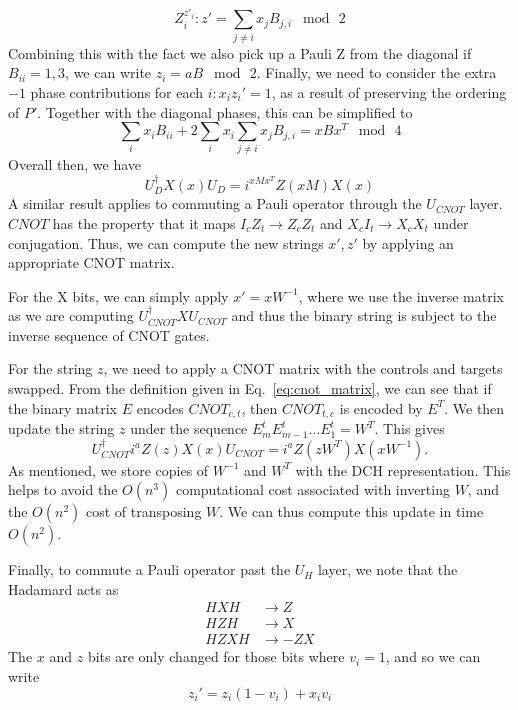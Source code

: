 \[Z_{i}^{z'_{i}}:z' = \sum_{j\neq i}x_{j}B_{j,i}\;\bmod\,2\]
Combining this with the fact we also pick up a Pauli Z from the diagonal if $B_{ii}=1,3$, we can write $z_{i}=aB\;\bmod\,2$. Finally, we need to consider the extra $-1$ phase  contributions for each $i:x_{i}z_{i}'=1$, as a result of preserving the ordering of $P'$. Together with the diagonal phases, this can be simplified to
\[
\sum_{i}x_{i}B_{ii} + 2\sum_{i}x_{i}\sum_{j\neq i}x_{j}B_{j,i} = xBx^{T}\;\bmod\, 4
\]
Overall then, we have
\begin{equation}
U_{D}^{\dagger}X(x)U_{D} = i^{xMx^{T}}Z(xM)X(x)
\label{eq:dch_dupdate}
\end{equation}
A similar result applies to commuting a Pauli operator through the $U_{CNOT}$ layer. $CNOT$ has the property that it maps $I_{c}Z_{t}\rightarrow Z_{c}Z_{t}$ and $X_{c}I_{t}\rightarrow X_{c}X_{t}$ under conjugation. Thus, we can compute the new strings $x',z'$ by applying an appropriate CNOT matrix.\par
For the X bits, we can simply apply $x'=xW^{-1}$, where we use the inverse matrix as we are computing $U_{CNOT}^{\dagger} X U_{CNOT}$ and thus the binary string is subject to the inverse sequence of CNOT gates. \par
For the string $z$, we need to apply a CNOT matrix with the controls and targets swapped. From the definition given in Eq.~\ref{eq:cnot_matrix}, we can see that if the binary matrix $E$ encodes $CNOT_{c,t}$, then $CNOT_{t,c}$ is encoded by $E^{T}$. We then update the string $z$ under the sequence $E_{m}^{t}E_{m-1}^{t}\dots E_{1}^{t} = W^{T}$. This gives
\begin{equation}
U_{CNOT}^{\dagger}i^{a}Z(z)X(x)U_{CNOT} = i^{a}Z(zW^{T})X(xW^{-1}).
\label{eq:dch_cupdate}
\end{equation}
As mentioned, we store copies of $W^{-1}$ and $W^{T}$ with the DCH representation. This helps to avoid the $O(n^{3})$ computational cost associated with inverting $W$, and the $O(n^{2})$ cost of transposing $W$. We can thus compute this update in time $O(n^{2})$.\par
Finally, to commute a Pauli operator past the $U_{H}$ layer, we note that the Hadamard acts as
\[
\begin{array}{rcl}
HXH & \rightarrow Z\\
HZH & \rightarrow X\\
HZXH & \rightarrow -ZX
\end{array}
\]
The $x$ and $z$ bits are only changed for those bits where $v_{i}=1$, and so we can write
\[z_{i}' = z_{i}(1-v_{i}) + x_{i}v_{i}\]
